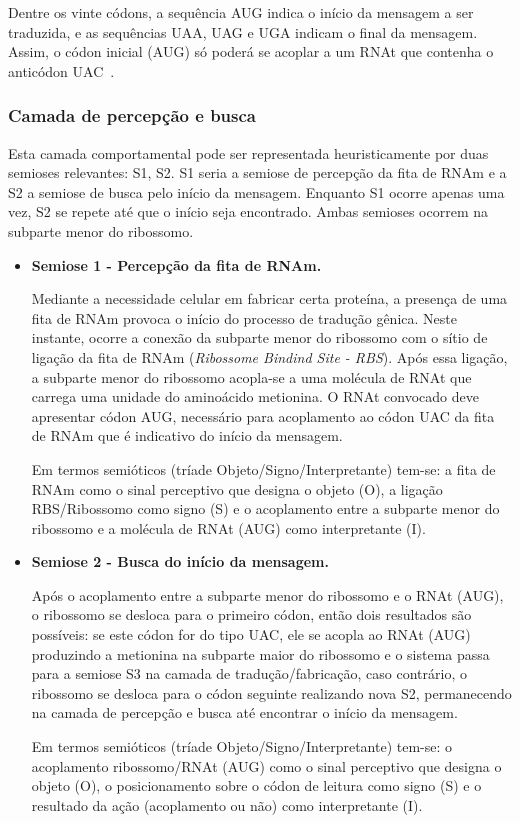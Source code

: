 Dentre os vinte  códons, a sequência AUG indica o início da mensagem a ser traduzida, e as sequências UAA, UAG e UGA indicam o final da mensagem. Assim, o códon inicial (AUG) só poderá se acoplar a um RNAt que contenha o anticódon UAC~\cite{ridley99,lodish12}.

\subsubsection*{Camada de percepção e busca}

Esta camada comportamental pode ser representada heuristicamente por duas semioses relevantes: S1, S2. S1 seria a semiose de percepção da fita de RNAm e a S2 a semiose de busca pelo início da mensagem. Enquanto S1 ocorre apenas uma vez, S2 se repete até que o início seja encontrado. Ambas semioses ocorrem na subparte menor do ribossomo.

\begin{itemize}
	\item \textbf{Semiose 1 - Percepção da fita de RNAm.}

		Mediante a necessidade celular em fabricar certa proteína, a presença de uma fita de RNAm provoca o início do processo de tradução gênica. Neste instante, ocorre a conexão da subparte menor do ribossomo com o sítio de ligação da fita de RNAm (\textit{Ribossome Bindind Site - RBS}). Após essa ligação, a subparte menor do ribossomo acopla-se a uma molécula de RNAt que carrega uma unidade do aminoácido metionina. O RNAt convocado deve apresentar códon AUG, necessário para acoplamento ao códon UAC da fita de RNAm que é indicativo do início da mensagem.

		Em termos semióticos (tríade Objeto/Signo/Interpretante) tem-se: a fita de RNAm como o sinal perceptivo que designa o objeto (O), a ligação RBS/Ribossomo como signo (S) e o acoplamento entre a subparte menor do ribossomo e a molécula de RNAt (AUG) como interpretante (I).


		\item \textbf{Semiose 2 - Busca do início da mensagem.}

		Após o acoplamento entre a subparte menor do ribossomo e o RNAt (AUG), o ribossomo se desloca para o primeiro códon, então dois resultados são possíveis: se este códon for do tipo UAC, ele se acopla ao RNAt (AUG) produzindo a metionina na subparte maior do ribossomo e o sistema passa para a semiose S3 na camada de tradução/fabricação, caso contrário, o ribossomo se desloca para o códon seguinte realizando nova S2, permanecendo na camada de percepção e busca até encontrar o início da mensagem.

		Em termos semióticos (tríade Objeto/Signo/Interpretante) tem-se: o acoplamento ribossomo/RNAt (AUG) como o sinal perceptivo que designa o objeto (O), o posicionamento sobre o códon de leitura como signo (S) e o resultado da ação (acoplamento ou não) como interpretante (I).


\end{itemize}

